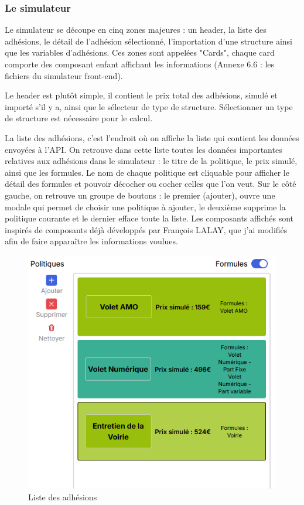 \documentclass[a4paper,12pt]{report}
\begin{document}
\subsubsection{Le simulateur}

Le simulateur se découpe en cinq zones majeures : un header, la liste des adhésions, le détail de l'adhésion sélectionné, l'importation d'une structure ainsi que les variables d'adhésions. Ces zones sont appelées "Cards", chaque card comporte des composant enfant affichant les informations (Annexe 6.6 : les fichiers du simulateur front-end).

\vspace{1em}

Le header est plutôt simple, il contient le prix total des adhésions, simulé et importé s'il y a, ainsi que le sélecteur de type de structure. Sélectionner un type de structure est nécessaire pour le calcul.

\vspace{1em}

La liste des adhésions, c'est l'endroit où on affiche la liste qui contient les données envoyées à l'API. On retrouve dans cette liste toutes les données importantes relatives aux adhésions dans le simulateur : le titre de la politique, le prix simulé, ainsi que les formules. Le nom de chaque politique est cliquable pour afficher le détail des formules et pouvoir décocher ou cocher celles que l'on veut. Sur le côté gauche, on retrouve un groupe de boutons  : le premier (ajouter), ouvre une modale qui permet de choisir une politique à ajouter, le deuxième supprime la politique courante et le dernier efface toute la liste. Les composants affichés sont inspirés de composants déjà développés par François LALAY, que j'ai modifiés afin de faire apparaître les informations voulues.

\begin{figure}[H]
    \centering
    \includegraphics[scale=0.5]{adhesionList.png}
    \caption{Liste des adhésions}
    \label{fig:list-adhe}
\end{figure}
\end{document}
